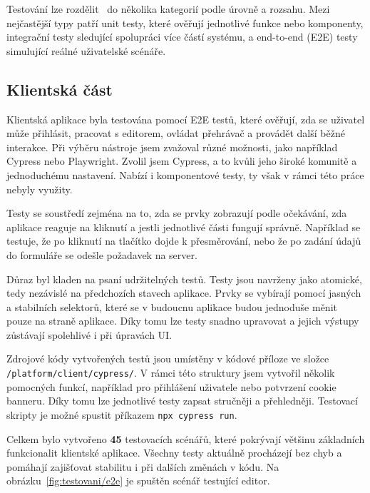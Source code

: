 Testování lze rozdělit~\cite{meszaros_2007} do několika kategorií podle úrovně a rozsahu. 
Mezi nejčastější typy patří unit testy, které ověřují jednotlivé funkce nebo komponenty, integrační testy sledující spolupráci více částí systému, a end-to-end (E2E) testy simulující reálné uživatelské scénáře. 

\subsection{Klientská část}

Klientská aplikace byla testována pomocí E2E testů, které ověřují, zda se uživatel může přihlásit, pracovat s editorem, ovládat přehrávač a provádět další běžné interakce. 
Při výběru nástroje jsem zvažoval různé možnosti, jako například Cypress nebo Playwright. 
Zvolil jsem Cypress, a to kvůli jeho široké komunitě a jednoduchému nastavení.
Nabízí i komponentové testy, ty však v rámci této práce nebyly využity.

Testy se soustředí zejména na to, zda se prvky zobrazují podle očekávání, zda aplikace reaguje na kliknutí a jestli jednotlivé části fungují správně.
Například se testuje, že po kliknutí na tlačítko dojde k přesměrování, nebo že po zadání údajů do formuláře se odešle požadavek na server.

Důraz byl kladen na psaní udržitelných testů. 
Testy jsou navrženy jako atomické, tedy nezávislé na předchozích stavech aplikace. 
Prvky se vybírají pomocí jasných a stabilních selektorů, které se v budoucnu aplikace budou jednoduše měnit pouze na straně aplikace.
Díky tomu lze testy snadno upravovat a jejich výstupy zůstávají spolehlivé i při úpravách UI.


Zdrojové kódy vytvořených testů jsou umístěny v kódové příloze ve složce \texttt{/platform/client/cypress/}. 
V rámci této struktury jsem vytvořil několik pomocných funkcí, například pro přihlášení uživatele nebo potvrzení cookie banneru. 
Díky tomu lze jednotlivé testy zapsat stručněji a přehledněji.
Testovací skripty je možné spustit příkazem \verb|npx cypress run|.

Celkem bylo vytvořeno \textbf{45} testovacích scénářů, které pokrývají většinu základních funkcionalit klientské aplikace. 
Všechny testy aktuálně procházejí bez chyb a pomáhají zajišťovat stabilitu i při dalších změnách v kódu.
Na obrázku~\ref{fig:testovani/e2e} je spuštěn scénář testující editor.

